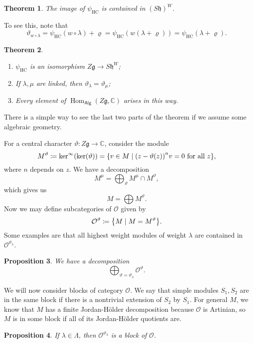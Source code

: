 \documentclass[leqno, openany]{memoir}
\newtheorem{thm}{Theorem}[section]
\newtheorem{prop}[thm]{Proposition}
\theoremstyle{definition}
\theoremstyle{remark}
\theoremstyle{plain}
\theoremstyle{definition}
\theoremstyle{remark}
\newcommand{\C}{\mathbb{C}}
\newcommand{\cO}{\mathcal{O}}
\newcommand{\g}{\mathfrak{g}}
\newcommand{\h}{\mathfrak{h}}
\newcommand{\mc}[1]{\mathcal{#1}}
\newcommand{\mr}[1]{\mathrm{#1}}
\newcommand{\ms}[1]{\mathsf{#1}}
\DeclareMathOperator{\Hom}{Hom}
\begin{document}
\begin{thm}
    The image of $\psi_{\mr{HC}}$ is contained in ${(S \h)}^W$.
\end{thm}

To see this, note that
\[ \vartheta_{w \circ \lambda} = \psi_{\mr{HC}}(w \circ \lambda) + \varrho = \psi_{\mr{HC}}(w(\lambda + \varrho)) = \psi_{\mr{HC}}(\lambda + \varrho). \]

\begin{thm}\leavevmode
    \begin{enumerate}
        \item $\psi_{\mr{HC}}$ is an isomorphism $Z \g \to S \h^W$;
        \item If $\lambda, \mu$ are linked, then $\vartheta_{\lambda} = \vartheta_{\mu}$;
        \item Every element of $\Hom_{\ms{Alg}}(Z \g, \C)$ arises in this way.
    \end{enumerate}
\end{thm}
There is a simple way to see the last two parts of the theorem if we assume some algebraic geometry.

For a central character $\vartheta \colon Z\g \to \C$, consider the module
\[ M^{\vartheta} \coloneqq \ker^{\infty}(\ker(\vartheta)) = \qty{ v \in M \mid {(z - \vartheta(z))}^n v = 0 \text{ for all } z}, \]
where $n$ depends on $z$. We have a decomposition
\[ M^{\mu} = \bigoplus_{\vartheta} M^{\mu} \cap M^{\vartheta}, \]
which gives us
\[ M = \bigoplus M^{\vartheta}. \]
Now we may define subcategories of $\cO$ given by
\[ \cO^{\vartheta} \coloneqq \qty{M \mid M = M^{\vartheta}}. \]
Some examples are that all highest weight modules of weight $\lambda$ are contained in $\mc{O}^{\vartheta_{\lambda}}$.

\begin{prop}
    We have a decomposition
    \[ \bigoplus_{\vartheta = \vartheta_{\lambda}} \mc{O}^{\vartheta}. \]
\end{prop}

We will now consider blocks of category $\mc{O}$. We say that simple modules $S_1, S_2$ are in the same block if there is a nontrivial extension of $S_2$ by $S_1$. For general $M$, we know that $M$ has a finite Jordan-H\"older decomposition because $\mc{O}$ is Artinian, so $M$ is in some block if all of its Jordan-H\"older quotients are.

\begin{prop}
    If $\lambda \in \Lambda$, then $\mc{O}^{\vartheta_{\lambda}}$ is a block of $\mc{O}$.
\end{prop}
\end{document}
